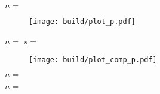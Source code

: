 \begin{table}[H]
	\caption{}
	\makebox[\textwidth]{
		\centering
		}
	\label{tab:p}
\end{table}

$n = $

\begin{figure}[H]
	\texttt{[image: build/plot\_p.pdf]}
	\caption{}
	\label{fig:plot_p}
\end{figure}

$n = $ $s = $

\begin{figure}[H]
	\texttt{[image: build/plot\_comp\_p.pdf]}
	\caption{}
	\label{fig:plot_comp_p}
\end{figure}

$n = $

$n = $
